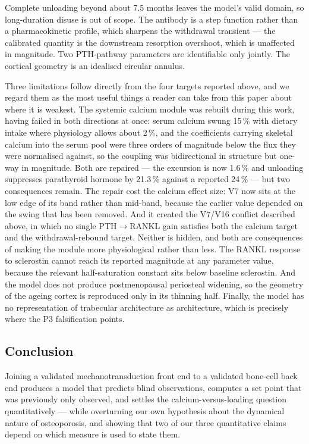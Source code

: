 \documentclass[10pt,letterpaper]{article}
\begin{document}
Complete unloading beyond about 7.5 months leaves the model's valid domain, so
long-duration disuse is out of scope. The antibody is a step function rather
than a pharmacokinetic profile, which sharpens the withdrawal transient ---
the calibrated quantity is the downstream resorption overshoot, which is
unaffected in magnitude. Two PTH-pathway parameters are identifiable only
jointly. The cortical geometry is an idealised circular annulus.

Three limitations follow directly from the four targets reported above, and we
regard them as the most useful things a reader can take from this paper about
where it is weakest. The systemic calcium module was rebuilt during this
work, having failed in both directions at once: serum calcium swung 15\,\% with
dietary intake where physiology allows about 2\,\%, and the coefficients
carrying skeletal calcium into the serum pool were three orders of magnitude
below the flux they were normalised against, so the coupling was bidirectional
in structure but one-way in magnitude. Both are repaired --- the excursion is now
1.6\,\% and unloading suppresses parathyroid hormone by 21.3\,\% against a
reported 24\,\% \cite{spatz2012} --- but two consequences remain. The repair
cost the calcium effect size: V7 now sits at the low edge of its band rather
than mid-band, because the earlier value depended on the swing that has been
removed. And it created the V7/V16 conflict described above, in which no single
PTH$\rightarrow$RANKL gain satisfies both the calcium target and the
withdrawal-rebound target. Neither is hidden, and both are consequences of
making the module more physiological rather than less. The RANKL response to
sclerostin cannot reach its reported magnitude at any parameter value, because
the relevant half-saturation constant sits below baseline sclerostin. And the
model does not produce postmenopausal periosteal widening, so the geometry of
the ageing cortex is reproduced only in its thinning half. Finally, the
model has no representation of trabecular architecture as architecture, which
is precisely where the P3 falsification points.

\subsection*{Conclusion}

Joining a validated mechanotransduction front end to a validated bone-cell
back end produces a model that predicts blind observations, computes a set
point that was previously only observed, and settles the calcium-versus-loading
question quantitatively --- while overturning our own hypothesis about the
dynamical nature of osteoporosis, and showing that two of our three
quantitative claims depend on which measure is used to state them.
\end{document}
